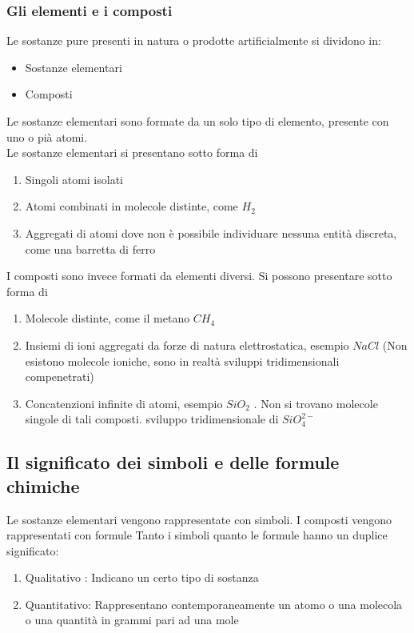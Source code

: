 \documentclass{article}
\begin{document}
\subsubsection{Gli elementi e i composti}
Le sostanze pure presenti in natura o prodotte artificialmente si dividono in:
\begin{itemize}
    \item Sostanze elementari
    \item Composti
\end{itemize}
Le sostanze elementari sono formate da un solo tipo di elemento, presente con uno o pià atomi.\\
Le sostanze elementari si presentano sotto forma di 
\begin{enumerate}
    \item Singoli atomi isolati
    \item Atomi combinati in molecole distinte, come $H_2$
    \item Aggregati di atomi dove non è possibile individuare nessuna entità discreta, come una barretta di ferro
\end{enumerate}

I composti sono invece formati da elementi diversi. Si possono presentare sotto forma di 
\begin{enumerate}
    \item Molecole distinte, come il metano $CH_4$
    \item Insiemi di ioni aggregati da forze di natura elettrostatica, esempio $NaCl$ (Non esistono molecole
    ioniche, sono in realtà sviluppi tridimensionali compenetrati)
    \item Concatenzioni infinite di atomi, esempio $SiO_2$ . Non si trovano molecole singole di tali composti. sviluppo tridimensionale di $SiO_4^{2-}$
\end{enumerate}
\subsection{Il significato dei simboli e delle formule chimiche}
Le sostanze elementari vengono rappresentate con simboli. I composti vengono rappresentati con formule
Tanto i simboli quanto le formule hanno un duplice significato:
\begin{enumerate}
    \item Qualitativo : Indicano un certo tipo di sostanza
    \item Quantitativo: Rappresentano contemporaneamente un atomo o una molecola o una quantità in grammi pari ad una mole
\end{enumerate}
\end{document}
